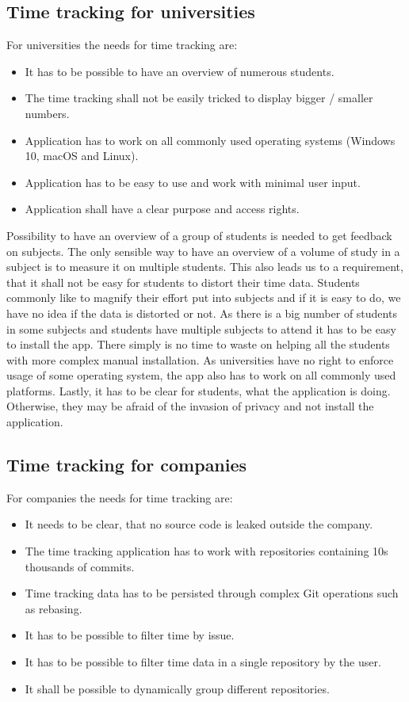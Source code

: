 \subsection{Time tracking for universities}\label{subsec:time-tracking-for-universities}
For universities the needs for time tracking are:
\begin{itemize}
    \item It has to be possible to have an overview of numerous students.
    \item The time tracking shall not be easily tricked to display bigger / smaller numbers.
    \item Application has to work on all commonly used operating systems (Windows 10, macOS and Linux).
    \item Application has to be easy to use and work with minimal user input.
    \item Application shall have a clear purpose and access rights.
\end{itemize}

Possibility to have an overview of a group of students is needed to get feedback on subjects.
The only sensible way to have an overview of a volume of study in a subject is to measure it on multiple students.
This also leads us to a requirement, that it shall not be easy for students to distort their time data.
Students commonly like to magnify their effort put into subjects and if it is easy to do, we have no idea if the data is distorted or not.
As there is a big number of students in some subjects and students have multiple subjects to attend it has to be easy to install the app.
There simply is no time to waste on helping all the students with more complex manual installation.
As universities have no right to enforce usage of some operating system, the app also has to work on all commonly used platforms.
Lastly, it has to be clear for students, what the application is doing.
Otherwise, they may be afraid of the invasion of privacy and not install the application.

\subsection{Time tracking for companies}\label{subsec:time-tracking-for-companies}
For companies the needs for time tracking are:
\begin{itemize}
    \item It needs to be clear, that no source code is leaked outside the company.
    \item The time tracking application has to work with repositories containing 10s thousands of commits.
    \item Time tracking data has to be persisted through complex Git operations such as rebasing.
    \item It has to be possible to filter time by issue.
    \item It has to be possible to filter time data in a single repository by the user.
    \item It shall be possible to dynamically group different repositories.
\end{itemize}


